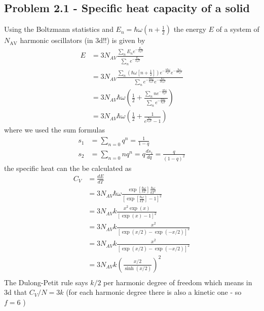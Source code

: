 \documentclass[10pt,a4paper]{book}
\theoremstyle{definition}
\begin{document}
\subsection{Problem 2.1 - Specific heat capacity of a solid}
Using the Boltzmann statistics and $E_n=\hbar\omega(n+\frac{1}{2})$ the energy $E$ of a system of $N_\text{AV}$ harmonic oscillators (in 3d!!) is given by 
\begin{align}
    E
    &=3N_{AV}\frac{\sum_nE_ne^{-\frac{E_n}{k_BT}}}{\sum_ne^{-\frac{E_n}{k_{B}T}}}\\
    &=3N_{AV}\frac{\sum_n\left(\hbar\omega\left[n+\frac{1}{2}\right]\right)e^{-\frac{n\hbar\omega}{k_BT}}e^{-\frac{\hbar\omega}{2k_BT}}}{\sum_ne^{-\frac{n\hbar\omega}{k_BT}}e^{-\frac{\hbar\omega}{2k_BT}}}\\
    &=3N_{AV}\hbar\omega\left(\frac{1}{2}+\frac{\sum_n ne^{-\frac{n\hbar\omega}{k_BT}}}{\sum_ne^{-\frac{n\hbar\omega}{k_BT}}}\right)\\
    &=3N_{AV}\hbar\omega\left(\frac{1}{2}+\frac{1}{e^{\frac{\hbar\omega}{k_BT}}-1}\right)
\end{align}
where we used the sum formulas
\begin{align}
    s_1&=\sum_{n=0}q^n=\frac{1}{1-q}\\
    s_2&=\sum_{n=0}nq^n=q\frac{ds_1}{dq}=\frac{q}{(1-q)^2}
\end{align}
the specific heat can the be calculated as
\begin{align}
    C_V&=\frac{dE}{dT}\\
    &=3N_{AV}\hbar\omega\frac{\exp\left[\frac{\hbar\omega}{kT}\right]\frac{\hbar\omega}{kT^2}}{\left[\exp\left[\frac{\hbar\omega}{kT}\right]-1\right]^2}\\
    &=3N_{AV}k\frac{x^2\exp(x)}{\left[\exp(x)-1\right]^2}\\
    &=3N_{AV}k\frac{x^2}{\left[\exp(x/2)-\exp(-x/2)\right]^2}\\
    &=3N_{AV}k\frac{x^2}{\left[\exp(x/2)-\exp(-x/2)\right]^2}\\
    &=3N_{AV}k\left(\frac{x/2}{\sinh(x/2)}\right)^2\\
\end{align}
The Dulong-Petit rule says $k/2$ per harmonic degree of freedom which means in 3d that $C_V/N=3k$ (for each harmonic degree there is also a kinetic one - so $f=6$ )
\begin{center}
\end{center}
\end{document}
